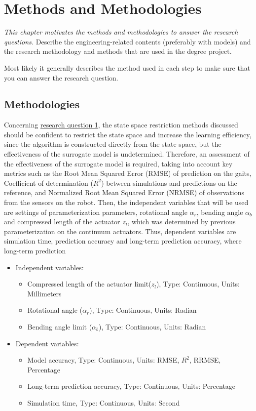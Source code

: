 \chapter{Methods and Methodologies}
\label{chap3}
\textit{This chapter motivates the methods and methodologies to answer the research questions.}
Describe the engineering-related contents (preferably with models) and the research methodology and methods that are used in the degree project. 

Most likely it generally describes the method used in each step to make sure that you can answer the research question.

\section{Methodologies}
Concerning \hyperref[rq1]{research question 1}, the state space restriction methods discussed should be confident to restrict the state space and increase the learning efficiency, since the algorithm is constructed directly from the state space, but the effectiveness of the surrogate model is undetermined. Therefore, an assessment of the effectiveness of the surrogate model is required, taking into account key metrics such as the Root Mean Squared Error (RMSE) of prediction on the gaits, Coefficient of determination ($R^2$) between simulations and predictions on the reference, and Normalized Root Mean Squared Error (NRMSE) of observations from the sensors on the robot. Then, the independent variables that will be used are settings of parameterization parameters, rotational angle $\alpha_r$, bending angle $\alpha_b$ and compressed length of the actuator $z_l$, which was determined by previous parameterization on the continuum actuators\cite{jiOmnidirectionalWalkingQuadruped2022}. Thus, dependent variables are simulation time, prediction accuracy and long-term prediction accuracy, where long-term prediction 
\begin{itemize}
    \item Independent variables: 
    \begin{itemize}
        \item Compressed length of the actuator limit($z_l$), Type: Continuous, Units: Millimeters
        \item Rotational angle ($\alpha_r$), Type: Continuous, Units: Radian
        \item Bending angle limit ($\alpha_b$), Type: Continuous, Units: Radian
    \end{itemize}
    \item Dependent variables:
    \begin{itemize}
        \item Model accuracy, Type: Continuous, Units: RMSE, $R^2$, RRMSE, Percentage
        \item Long-term prediction accuracy, Type: Continuous, Units: Percentage
        \item Simulation time, Type: Continuous, Units: Second
    \end{itemize}
\end{itemize}

